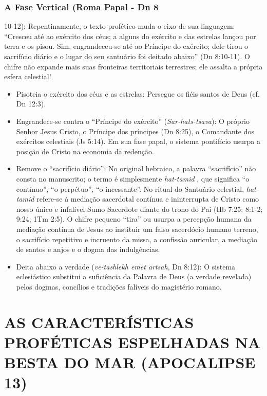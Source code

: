 \subsubsection*{A Fase Vertical (Roma Papal - Dn 8}
10-12): Repentinamente, o texto profético muda o eixo de sua linguagem: ``Cresceu até ao exército dos céus; a alguns do exército e das estrelas lançou por terra e os pisou. Sim, engrandeceu-se até ao Príncipe do exército; dele tirou o sacrifício diário e o lugar do seu santuário foi deitado abaixo'' (Dn 8:10-11). O chifre não expande mais suas fronteiras territoriais terrestres; ele assalta a própria esfera celestial!
\begin{itemize}
  \item Pisoteia o exército dos céus e as estrelas: Persegue os fiéis santos de Deus (cf. Dn 12:3).
  \item Engrandece-se contra o ``Príncipe do exército'' (\textit{Sar-hats-tsava}): O próprio Senhor Jesus Cristo, o Príncipe dos príncipes (Dn 8:25), o Comandante dos exércitos celestiais (Js 5:14). Em sua fase papal, o sistema pontifício usurpa a posição de Cristo na economia da redenção.
  \item Remove o ``sacrifício diário'': No original hebraico, a palavra ``sacrifício'' não consta no manuscrito; o termo é simplesmente \textit{hat-tamid} , que significa ``o contínuo'', ``o perpétuo'', ``o incessante''. No ritual do Santuário celestial, \textit{hat-tamid} refere-se à mediação sacerdotal contínua e ininterrupta de Cristo como nosso único e infalível Sumo Sacerdote diante do trono do Pai (Hb 7:25; 8:1-2; 9:24; 1Tm 2:5). O chifre pequeno ``tira'' ou usurpa a percepção humana da mediação contínua de Jesus ao instituir um falso sacerdócio humano terreno, o sacrifício repetitivo e incruento da missa, a confissão auricular, a mediação de santos e anjos e o dogma das indulgências.
  \item Deita abaixo a verdade (\textit{ve-tashlekh emet artsah}, Dn 8:12): O sistema eclesiástico substitui a suficiência da Palavra de Deus (a verdade revelada) pelos dogmas, concílios e tradições falíveis do magistério romano.
\end{itemize}




\section{AS CARACTERÍSTICAS PROFÉTICAS ESPELHADAS NA BESTA DO MAR (APOCALIPSE 13)}



